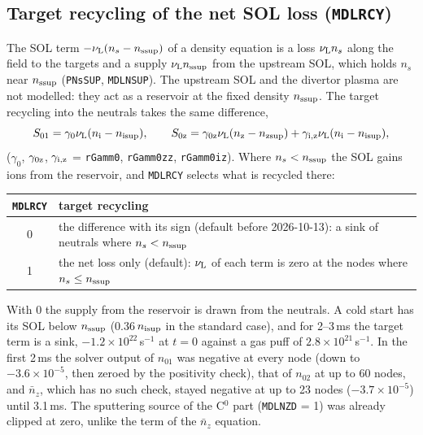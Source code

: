 \documentclass[11pt]{article}
\def\r#1{{\rm#1}}
\def\ni{n_\r{i}}
\def\nz{n_\r{z}}
\def\nsup#1{n_\r{#1sup}}
\def\nnz{\bar{n}_{z}}
\def\nuL{\nu_\r{L}}
\begin{document}
\subsection{Target recycling of the net SOL loss (\texttt{MDLRCY})}
\label{sec:mdlrcy}

The SOL term $-\nuL(n_s-\nsup{s})$ of a density equation is a loss $\nuL n_s$ along
the field to the targets and a supply $\nuL\nsup{s}$ from the upstream SOL, which
holds $n_s$ near $\nsup{s}$ (\texttt{PNsSUP}, \texttt{MDLNSUP}).  The upstream SOL and
the divertor plasma are not modelled: they act as a reservoir at the fixed density
$\nsup{s}$.  The target recycling into the neutrals takes the same difference,
\begin{equation}
  S_{01} = \gamma_0\nuL(\ni-\nsup{i}),\qquad
  S_{0\r{z}} = \gamma_\r{0z}\nuL(\nz-\nsup{z}) + \gamma_\r{i,z}\nuL(\ni-\nsup{i}),
\end{equation}
($\gamma_0$, $\gamma_\r{0z}$, $\gamma_\r{i,z}$ = \texttt{rGamm0}, \texttt{rGamm0zz},
\texttt{rGamm0iz}).  Where $n_s<\nsup{s}$ the SOL gains ions from the reservoir, and
\texttt{MDLRCY} selects what is recycled there:

\begin{center}
\begin{tabular}{|c|l|}\hline
\texttt{MDLRCY} & target recycling \\\hline
0 & the difference with its sign (default before 2026-10-13): a sink of neutrals where $n_s<\nsup{s}$ \\
1 & the net loss only (default): $\nuL$ of each term is zero at the nodes where $n_s\le\nsup{s}$ \\\hline
\end{tabular}
\end{center}

With 0 the supply from the reservoir is drawn from the neutrals.  A cold start has
its SOL below $\nsup{s}$ (0.36\,$\nsup{i}$ in the standard case), and for 2--3\,ms the
target term is a sink, $-1.2\times10^{22}$\,s$^{-1}$ at $t=0$ against a gas puff of
$2.8\times10^{21}$\,s$^{-1}$.  In the first 2\,ms the solver output of $n_{01}$ was
negative at every node (down to $-3.6\times10^{-5}$, then zeroed by the positivity
check), that of $n_{02}$ at up to 60 nodes, and $\nnz$, which has no such check, stayed
negative at up to 23 nodes ($-3.7\times10^{-5}$) until 3.1\,ms.  The sputtering source
of the C$^0$ part (\texttt{MDLNZD} = 1) was already clipped at zero, unlike the term of
the $\nnz$ equation.
\end{document}
